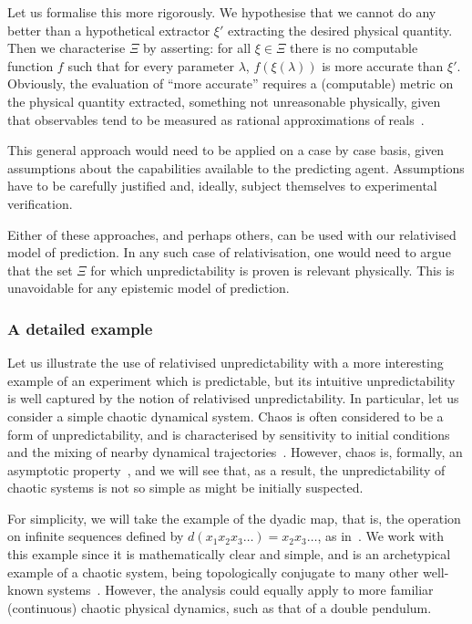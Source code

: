 \documentclass[information,article,submit,moreauthors,pdftex,12pt,a4paper]{mdpi}
\theoremstyle{mdpi}
\newcounter{ex}
\newcounter{re}
\theoremstyle{mdpidefinition}
\begin{document}
Let us formalise this more rigorously.
We hypothesise that we cannot do any better than a hypothetical extractor $\xi'$ extracting the desired physical quantity.
Then we characterise $\Xi$ by asserting: for all $\xi\in\Xi$ there is no computable function $f$ such that for every parameter $\lambda$, $f(\xi(\lambda))$ is more accurate than $\xi'$.
Obviously, the evaluation of ``more accurate'' requires a (computable) metric on the physical quantity extracted, something not unreasonable physically, given that observables tend to be measured as rational approximations of reals~\cite{Longo:2008ud}.

This general approach would need to be applied on a case by case basis, given assumptions about the capabilities available to the predicting agent.
Assumptions have to be carefully justified and, ideally, subject themselves to experimental verification.

Either of these approaches, and perhaps others, can be used with our relativised model of prediction.
In any such case of relativisation, one would need to argue that the set $\Xi$ for which unpredictability is proven is relevant physically.
This is unavoidable for any epistemic model of prediction.

\subsubsection{A detailed example}

Let us illustrate the use of relativised unpredictability with a more interesting example of an experiment which is  predictable, but its intuitive unpredictability is well captured by the notion of relativised unpredictability.
In particular, let us consider a simple chaotic dynamical system.
Chaos is often considered to be a form of unpredictability, and is characterised by sensitivity to initial conditions and the mixing of nearby dynamical trajectories~\cite{Werndl:2009nx}.
However, chaos is, formally, an asymptotic property~\cite{Paul:2009fv}, and we will see that, as a result, the unpredictability of chaotic systems is not so simple as might be initially suspected.

For simplicity, we will take the example of the dyadic map, that is, the operation on infinite sequences defined by $d(x_1x_2x_3\dots) = x_2x_3\dots$, as in~\cite{DBLP:conf/birthday/AbbottCS15}.
We work with this example since it is mathematically clear and simple, and is an archetypical example of a chaotic system, being topologically conjugate to many other well-known systems~\cite{Devaney-1989}.
However, the analysis could equally apply to more familiar (continuous) chaotic physical dynamics, such as that of a double pendulum.
\end{document}

